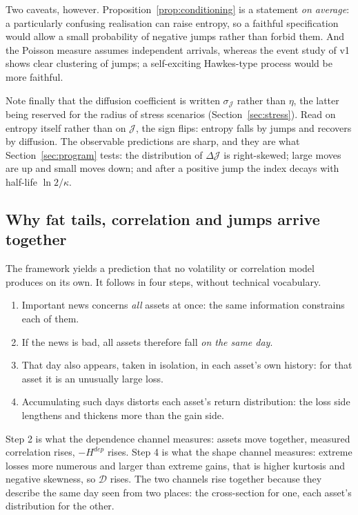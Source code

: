\documentclass[11pt]{article}
\theoremstyle{definition}
\theoremstyle{remark}
\newcommand{\JJ}{\mathcal{J}}
\newcommand{\DD}{\mathcal{D}}
\begin{document}
Two caveats, however. Proposition~\ref{prop:conditioning} is a statement
\emph{on average}: a particularly confusing realisation can raise entropy, so a
faithful specification would allow a small probability of negative jumps rather
than forbid them. And the Poisson measure assumes independent arrivals, whereas
the event study of v1 shows clear clustering of jumps; a self-exciting
Hawkes-type process would be more faithful.

Note finally that the diffusion coefficient is written $\sigma_\JJ$ rather than
$\eta$, the latter being reserved for the radius of stress scenarios
(Section~\ref{sec:stress}). Read on entropy itself rather than on $\JJ$, the sign
flips: entropy falls by jumps and recovers by diffusion. The observable
predictions are sharp, and they are what Section~\ref{sec:program} tests: the
distribution of $\Delta\JJ$ is right-skewed; large moves are up and small moves
down; and after a positive jump the index decays with half-life $\ln 2/\kappa$.

\subsection{Why fat tails, correlation and jumps arrive together}

The framework yields a prediction that no volatility or correlation model
produces on its own. It follows in four steps, without technical vocabulary.

\begin{enumerate}
\item Important news concerns \emph{all} assets at once: the same information
constrains each of them.
\item If the news is bad, all assets therefore fall \emph{on the same day}.
\item That day also appears, taken in isolation, in each asset's own history: for
that asset it is an unusually large loss.
\item Accumulating such days distorts each asset's return distribution: the loss
side lengthens and thickens more than the gain side.
\end{enumerate}

Step 2 is what the dependence channel measures: assets move together, measured
correlation rises, $-H^{dep}$ rises. Step 4 is what the shape channel measures:
extreme losses more numerous and larger than extreme gains, that is higher
kurtosis and negative skewness, so $\DD$ rises. The two channels rise together
because they describe the same day seen from two places: the cross-section for
one, each asset's distribution for the other.
\end{document}

